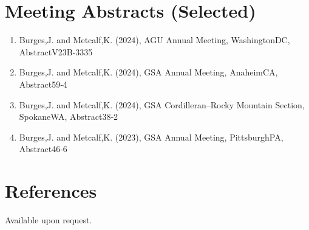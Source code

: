 \documentclass[10pt]{res}
\begin{document}
\section{Meeting Abstracts (Selected)}
\begin{enumerate}[label=\arabic*., leftmargin=0.5cm]
  \item Burges,J. and Metcalf,K. (2024), AGU Annual Meeting, WashingtonDC, AbstractV23B‑3335
  \item Burges,J. and Metcalf,K. (2024), GSA Annual Meeting, AnaheimCA, Abstract59‑4
  \item Burges,J. and Metcalf,K. (2024), GSA Cordilleran–Rocky Mountain Section, SpokaneWA, Abstract38‑2
  \item Burges,J. and Metcalf,K. (2023), GSA Annual Meeting, PittsburghPA, Abstract46‑6
\end{enumerate}

\section{References}
Available upon request.
\end{document}
